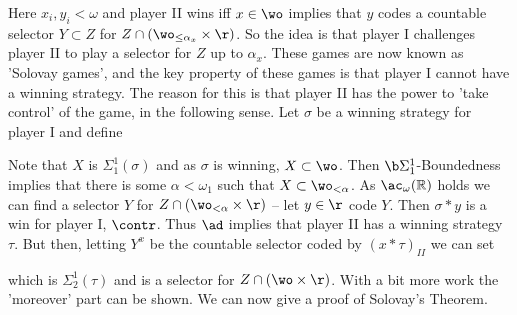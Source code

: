 Here $x_i,y_i<\omega$ and player II wins iff $x\in\wo$ implies that $y$ codes a countable selector $Y\subset Z$ for $Z\cap(\wo_{\leq\alpha_x}\times\r)$. So the idea is that player I challenges player II to play a selector for $Z$ up to $\alpha_x$. These games are now known as 'Solovay games', and the key property of these games is that player I cannot have a winning strategy. The reason for this is that player II has the power to 'take control' of the game, in the following sense. Let $\sigma$ be a winning strategy for player I and define

Note that $X$ is $\Sigma^1_1(\sigma)$ and as $\sigma$ is winning, $X\subset\wo$. Then $\b\Sigma^1_1$-Boundedness implies that there is some $\alpha<\omega_1$ such that $X\subset\wo_{<\alpha}$. As $\ac_\omega(\mathbb R)$ holds we can find a selector $Y$ for $Z\cap(\wo_{<\alpha}\times\r)$ -- let $y\in\r$ code $Y$. Then $\sigma*y$ is a win for player I, $\contr$. Thus $\ad$ implies that player II has a winning strategy $\tau$. But then, letting $Y^x$ be the countable selector coded by $(x*\tau)_{II}$ we can set

which is $\Sigma^1_2(\tau)$ and is a selector for $Z\cap(\wo\times\r)$. With a bit more work the 'moreover' part can be shown. We can now give a proof of Solovay's Theorem.

